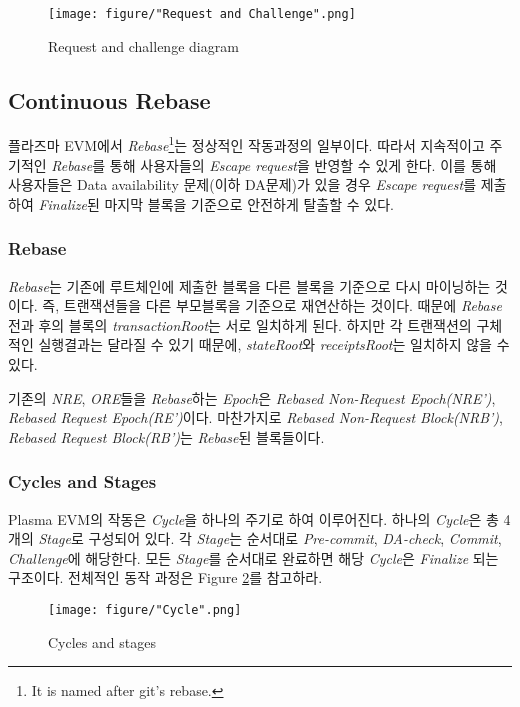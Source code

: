 \documentclass[letterpaper, 11pt]{article}
\begin{document}
\begin{figure}[!h]
\centering
\texttt{[image: figure/"Request and Challenge".png]}
\caption{Request and challenge diagram}
\label{fig:figure2}
\end{figure}

\subsection{Continuous Rebase} \label{subsec:continuous-rebase}
\begin{CJK}{UTF8}{mj}
플라즈마 EVM에서 \emph{Rebase}\footnote{It is named after git's rebase.}는 정상적인 작동과정의 일부이다. 따라서 지속적이고 주기적인 \emph{Rebase}를 통해 사용자들의 \emph{Escape request}을 반영할 수 있게 한다. 이를 통해 사용자들은 Data availability 문제(이하 DA문제)가 있을 경우 \emph{Escape request}를 제출하여 \emph{Finalize}된 마지막 블록을 기준으로 안전하게 탈출할 수 있다.
\end{CJK}

\subsubsection{Rebase}
\begin{CJK}{UTF8}{mj}
\emph{Rebase}는 기존에 루트체인에 제출한 블록을 다른 블록을 기준으로 다시 마이닝하는 것이다. 즉, 트랜잭션들을 다른 부모블록을 기준으로 재연산하는 것이다. 때문에 \emph{Rebase}전과 후의 블록의 \emph{transactionRoot}는 서로 일치하게 된다. 하지만 각 트랜잭션의 구체적인 실행결과는 달라질 수 있기 때문에, \emph{stateRoot}와 \emph{receiptsRoot}는 일치하지 않을 수 있다.

기존의 \emph{NRE}, \emph{ORE}들을 \emph{Rebase}하는 \emph{Epoch}은 \emph{Rebased Non-Request Epoch(NRE')}, \emph{Rebased Request Epoch(RE')}이다. 마찬가지로 \emph{Rebased Non-Request Block(NRB')}, \emph{Rebased Request Block(RB')}는 \emph{Rebase}된 블록들이다.
\end{CJK}

\subsubsection{Cycles and Stages}
\begin{CJK}{UTF8}{mj}
Plasma EVM의 작동은 \emph{Cycle}을 하나의 주기로 하여 이루어진다. 하나의 \emph{Cycle}은 총 4개의 \emph{Stage}로 구성되어 있다. 각 \emph{Stage}는 순서대로 \emph{Pre-commit}, \emph{DA-check}, \emph{Commit}, \emph{Challenge}에 해당한다. 모든 \emph{Stage}를 순서대로 완료하면 해당 \emph{Cycle}은 \emph{Finalize} 되는 구조이다. 전체적인 동작 과정은 Figure \ref{fig:cycle}를 참고하라.

\begin{figure}[!h]
\centering
\texttt{[image: figure/"Cycle".png]}
\caption{Cycles and stages}
\label{fig:cycle}
\end{figure}

\end{CJK}
\end{document}
